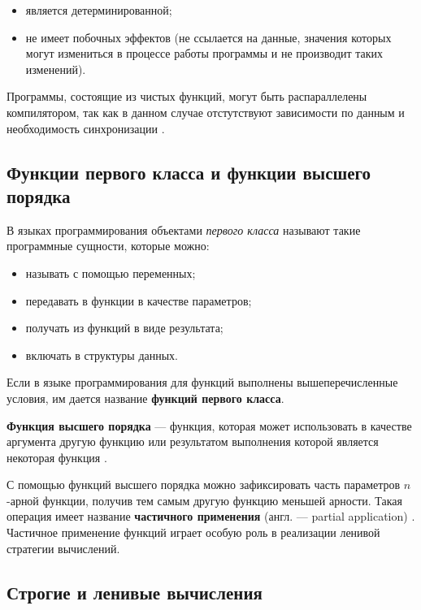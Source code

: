\begin{itemize}
    \item является детерминированной;
    \item не имеет побочных эффектов (не ссылается на данные, 
     значения которых могут измениться в процессе работы программы
     и не производит таких изменений). \cite{purefunctions}
\end{itemize}

Программы, состоящие из чистых функций, могут быть распараллелены
компилятором, так как в данном случае отстутствуют зависимости по данным
и необходимость синхронизации \cite[182]{staroletovfunlang}.

\subsection{Функции первого класса и функции высшего порядка}\label{sec:ch1/sec3/subsec3}

В языках программирования объектами \textit{первого класса} называют такие
программные сущности, которые можно:

\begin{itemize}
    \item называть с помощью переменных;
    \item передавать в функции в качестве параметров;
    \item получать из функций в виде результата;
    \item включать в структуры данных. \cite[с.~87]{sicp}
\end{itemize}

Если в языке программирования для функций выполнены вышеперечисленные условия,
им дается название \textbf{функций первого класса}.

\textbf{Функция высшего порядка} --- функция, которая может использовать в
качестве аргумента другую функцию или результатом выполнения которой является
некоторая функция \cite[с.~56]{fp93}.

С помощью функций высшего порядка можно зафиксировать часть параметров $n$-арной
функции, получив тем самым другую функцию меньшей арности.
Такая операция имеет название \textbf{частичного применения}
(англ. --- partial application) \cite{partialapplication}. 
Частичное применение функций играет особую роль в реализации ленивой стратегии вычислений.

\subsection{Строгие и ленивые вычисления}\label{sec:ch1/sec3/subsec4}

